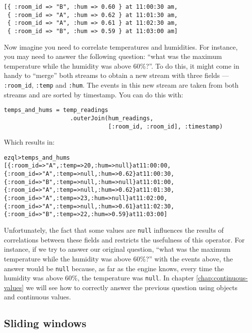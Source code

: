 \documentclass{report}
\newenvironment{evaluation}
{
  \framed
  \begin{alltt}
}
{
  \end{alltt}
  \endframed
}
\begin{document}
\begin{verbatim}
[{ :room_id => "B", :hum => 0.60 } at 11:00:30 am,
 { :room_id => "A", :hum => 0.62 } at 11:01:30 am,
 { :room_id => "A", :hum => 0.61 } at 11:02:30 am,
 { :room_id => "B", :hum => 0.59 } at 11:03:00 am]
\end{verbatim}

Now imagine you need to correlate temperatures and humidities. For
instance, you may need to answer the following question: ``what was
the maximum temperature while the humidity was above 60\%?''. To do
this, it might come in handy to ``merge'' both streams to obtain a new
stream with three fields --- \verb=:room_id=, \verb=:temp= and
\verb=:hum=. The events in this new stream are taken from both
streams and are sorted by timestamp. You can do this with:

\begin{verbatim}
temps_and_hums = temp_readings
                   .outerJoin(hum_readings,
                              [:room_id, :room_id], :timestamp)
\end{verbatim}

Which results in:
\pagebreak
\begin{evaluation}
ezql> temps_and_hums
[\{ :room_id => "A", :temp =>   20, :hum => null \} at 11:00:00,
 \{ :room_id => "A", :temp => null, :hum => 0.62 \} at 11:00:30,
 \{ :room_id => "B", :temp => null, :hum => null \} at 11:01:00,
 \{ :room_id => "A", :temp => null, :hum => 0.62 \} at 11:01:30,
 \{ :room_id => "A", :temp =>   23, :hum => null \} at 11:02:00,
 \{ :room_id => "A", :temp => null, :hum => 0.61 \} at 11:02:30,
 \{ :room_id => "B", :temp =>   22, :hum => 0.59 \} at 11:03:00]
\end{evaluation}

Unfortunately, the fact that some values are \verb=null= influences
the results of correlations between these fields and restricts the
usefulness of this operator. For instance, if we try to answer our
original question, ``what was the maximum temperature while the
humidity was above 60\%?'' with the events above, the answer would be
\verb=null= because, as far as the engine knows, every time the
humidity was above 60\%, the temperature was \verb=null=. In chapter
\ref{chap:continuous-values} we will see how to correctly answer the
previous question using objects and continuous values.

\subsection{Sliding windows}
\label{sec:sliding-windows}
\end{document}
